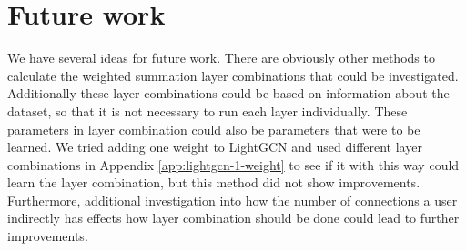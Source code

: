 \section{Future work}
We have several ideas for future work.
There are obviously other methods to calculate the weighted summation layer combinations that could be investigated.
Additionally these layer combinations could be based on information about the dataset, so that it is not necessary to run each layer individually.
These parameters in layer combination could also be parameters that were to be learned.
We tried adding one weight to LightGCN and used different layer combinations in Appendix \ref{app:lightgcn-1-weight} to see if it with this way could learn the layer combination, but this method did not show improvements.
Furthermore, additional investigation into how the number of connections a user indirectly has effects how layer combination should be done could lead to further improvements.




